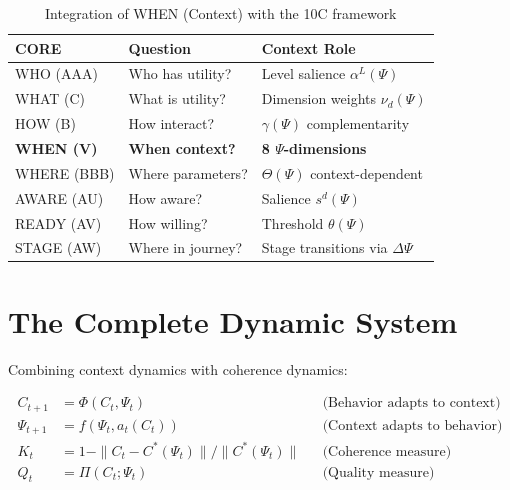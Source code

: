 \begin{table}[h]
\centering
\begin{tabular}{lll}
\toprule
\textbf{CORE} & \textbf{Question} & \textbf{Context Role} \\
\midrule
WHO (AAA) & Who has utility? & Level salience $\alpha^L(\Psi)$ \\
WHAT (C) & What is utility? & Dimension weights $\nu_d(\Psi)$ \\
HOW (B) & How interact? & $\gamma(\Psi)$ complementarity \\
\textbf{WHEN (V)} & \textbf{When context?} & \textbf{8 $\Psi$-dimensions} \\
WHERE (BBB) & Where parameters? & $\Theta(\Psi)$ context-dependent \\
AWARE (AU) & How aware? & Salience $s^d(\Psi)$ \\
READY (AV) & How willing? & Threshold $\theta(\Psi)$ \\
STAGE (AW) & Where in journey? & Stage transitions via $\Delta\Psi$ \\
\bottomrule
\end{tabular}
\caption{Integration of WHEN (Context) with the 10C framework}
\label{tab:10c-context-integration}
\end{table}



\section{The Complete Dynamic System}
\label{sec:context-system}


Combining context dynamics with coherence dynamics:

\begin{definition}
\begin{align}
C_{t+1} &= \Phi(C_t, \Psi_t) && \text{(Behavior adapts to context)} \\
\Psi_{t+1} &= f(\Psi_t, a_t(C_t)) && \text{(Context adapts to behavior)} \\
K_t &= 1 - \|C_t - C^*(\Psi_t)\| / \|C^*(\Psi_t)\| && \text{(Coherence measure)} \\
Q_t &= \Pi(C_t; \Psi_t) && \text{(Quality measure)}
\end{align}
\end{definition}

